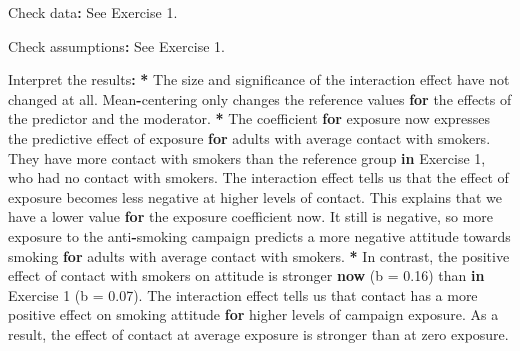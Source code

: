 \documentclass[a4paper]{book}
\newenvironment{Shaded}{\begin{snugshade}}{\end{snugshade}}
\newcommand{\KeywordTok}[1]{\textcolor[rgb]{0,0,0}{\textbf{#1}}}
\newcommand{\DataTypeTok}[1]{\textcolor[rgb]{0,0,0}{#1}}
\newcommand{\DecValTok}[1]{\textcolor[rgb]{0.00,0.00,0.00}{#1}}
\newcommand{\FloatTok}[1]{\textcolor[rgb]{0.00,0.00,0.00}{#1}}
\newcommand{\StringTok}[1]{\textcolor[rgb]{0.00,0.00,0.00}{#1}}
\newcommand{\ControlFlowTok}[1]{\textcolor[rgb]{0.00,0.00,0.00}{\textbf{#1}}}
\newcommand{\OperatorTok}[1]{\textcolor[rgb]{0.00,0.00,0.00}{\textbf{#1}}}
\newcommand{\ErrorTok}[1]{\textcolor[rgb]{0.00,0.00,0.00}{\textbf{#1}}}
\newcommand{\NormalTok}[1]{#1}
\theoremstyle{definition}
\theoremstyle{definition}
\theoremstyle{definition}
\theoremstyle{remark}
\begin{document}
\begin{Shaded}
\begin{Highlighting}[]
\NormalTok{Check data}\OperatorTok{:}\StringTok{ }\NormalTok{See Exercise }\DecValTok{1}\NormalTok{.  }
  
\NormalTok{Check assumptions}\OperatorTok{:}\StringTok{ }\NormalTok{See Exercise }\DecValTok{1}\NormalTok{.  }
  
\NormalTok{Interpret the results}\OperatorTok{:}\StringTok{  }
\StringTok{  }
\ErrorTok{*}\StringTok{ }\NormalTok{The size and significance of the interaction effect have not changed at all.}
\NormalTok{Mean}\OperatorTok{-}\NormalTok{centering only changes the reference values }\ControlFlowTok{for}\NormalTok{ the effects of the}
\NormalTok{predictor and the moderator.}
\OperatorTok{*}\StringTok{ }\NormalTok{The coefficient }\ControlFlowTok{for}\NormalTok{ exposure now expresses the predictive effect of exposure}
\ControlFlowTok{for}\NormalTok{ adults with average contact with smokers. They have more contact with}
\NormalTok{smokers than the reference group }\ControlFlowTok{in}\NormalTok{ Exercise }\DecValTok{1}\NormalTok{, who had no contact with}
\NormalTok{smokers. The interaction effect tells us that the effect of exposure becomes}
\NormalTok{less negative at higher levels of contact. This explains that we have a lower}
\NormalTok{value }\ControlFlowTok{for}\NormalTok{ the exposure coefficient now. It still is negative, so more exposure}
\NormalTok{to the anti}\OperatorTok{-}\NormalTok{smoking campaign predicts a more negative attitude towards}
\NormalTok{smoking }\ControlFlowTok{for}\NormalTok{ adults with average contact with smokers.}
\OperatorTok{*}\StringTok{ }\NormalTok{In contrast, the positive effect of contact with smokers on attitude is}
\NormalTok{stronger }\KeywordTok{now}\NormalTok{ (}\DataTypeTok{b =} \FloatTok{0.16}\NormalTok{) than }\ControlFlowTok{in}\NormalTok{ Exercise }\DecValTok{1}\NormalTok{ (}\DataTypeTok{b =} \FloatTok{0.07}\NormalTok{). The interaction effect}
\NormalTok{tells us that contact has a more positive effect on smoking attitude }\ControlFlowTok{for}
\NormalTok{higher levels of campaign exposure. As a result, the effect of contact at}
\NormalTok{average exposure is stronger than at zero exposure.}
  

\end{Highlighting}
\end{Shaded}
\end{document}
